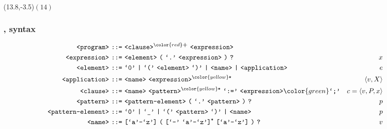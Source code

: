 \begin{frame}

\begin{textblock}{1}(13.8,-3.5)$(14)$\end{textblock}

\frametitle{\D{}, syntax}

\setcounter{equation}{0}

\begin{align*}
\nonterm{program}\ \textt{::=}&\ \nonterm{clause}^{\color{red}\textt{\bf +}}
\ \nonterm{expression}
& \\
\nonterm{expression}\ \textt{::=}&\ \nonterm{element}\ \textt{(}\ \term{.}
\ \nonterm{expression}\ \textt{)}\ \textt{?}
& x\\
\nonterm{element}\ \textt{::=}&\ \term{0}\ \textt{|}\ \term{(}
\ \nonterm{element}\ \term{)}\ \textt{|}\ \nonterm{name}\ \textt{|}
\ \nonterm{application}
& e\\
\nonterm{application}\ \textt{::=}&\ \nonterm{name}
\ \nonterm{expression}^{\color{yellow}\textt{*}}
& \left\langle v,X \right\rangle \\
\nonterm{clause}\ \textt{::=}&\ \nonterm{name}
\ \nonterm{pattern}^{\color{yellow}\textt{*}}\ \term{:=}
\ \nonterm{expression}{\color{green}\term{;}}
& c=\left\langle v, P, x \right\rangle \\
\nonterm{pattern}\ \textt{::=}&\ \nonterm{pattern-element}\ \textt{(}
\ \term{.}\ \nonterm{pattern}\ \textt{)}\ \textt{?}
& p\\
\nonterm{pattern-element}\ \textt{::=}&\ \term{0}\ \textt{|}\ \term{\_}
\ \textt{|}\ \term{(}\ \nonterm{pattern}\ \term{)}\ \textt{|}\ \nonterm{name}
& p\\
\nonterm{name}\ \textt{::=}&\ \textt{[}\term{a}\mathmono{-}\term{z}\textt{]}
\ \textt{(}\ \textt{[}\term{-}\ \term{a}\mathmono{-}\term{z}\textt{]}^\textt{*}
\ \textt{[}\term{a}\mathmono{-}\term{z}\textt{]}\ \textt{)}\ \textt{?}
& v
\end{align*}


\end{frame}
